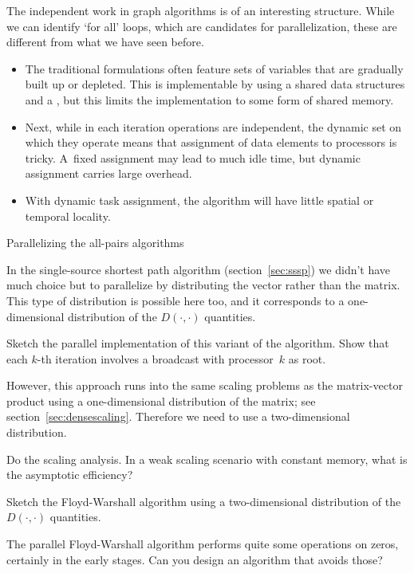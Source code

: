 The independent work in graph algorithms is of an interesting
structure.  While we can identify `for all' loops, which are
candidates for parallelization, these are different from what we have
seen before.
%
\begin{itemize}
\item The traditional formulations often feature sets of variables
  that are gradually built up or depleted. This is implementable by
  using a shared data structures and a , but this limits the
  implementation to some form of shared memory.
\item
  Next, while in each iteration operations are independent, the dynamic
  set on which they operate means that assignment of data
  elements to processors is tricky.
  A~fixed assignment may lead to much idle time, but dynamic
  assignment carries large overhead.
\item With dynamic task assignment, the algorithm
  will have little spatial or temporal locality.
\end{itemize}

 {Parallelizing the all-pairs algorithms}

In the single-source shortest path algorithm
(section~\ref{sec:sssp})
we didn't have much choice but to parallelize by distributing the vector rather than the
matrix.
This type of distribution is possible here too, and it
corresponds to a one-dimensional distribution of the $D(\cdot,\cdot)$
quantities.
\begin{exercise}
  Sketch the parallel implementation of this variant of the
  algorithm. Show that each $k$-th iteration involves a broadcast with
  processor~$k$ as root.
\end{exercise}
However, this approach runs into the same scaling problems as the
matrix-vector product using a one-dimensional distribution of the
matrix; see section~\ref{sec:densescaling}. Therefore we need to use a
two-dimensional distribution.
\begin{exercise}
  Do the scaling analysis. In a weak scaling scenario with constant memory, 
  what is the asymptotic efficiency?
\end{exercise}
\begin{exercise}
  Sketch the Floyd-Warshall algorithm using a two-dimensional
  distribution of the $D(\cdot,\cdot)$ quantities.
\end{exercise}
\begin{exercise}
  The parallel Floyd-Warshall algorithm performs quite some operations
  on zeros, certainly in the early stages. Can you design an algorithm
  that avoids those?
\end{exercise}

